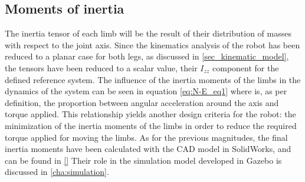 

\subsection{Moments of inertia} %
\label{sub:moments_of_inertia}
The inertia tensor of each limb will be the result of their distribution of masses with respect to the joint axis.
Since the kinematics analysis of the robot has been reduced to a planar case for both legs, as discussed in \ref{sec_kinematic_model}, the tensors have been reduced to a scalar value, their $I_{zz}$ component for the defined reference system.
The influence of the inertia moments of the limbs in the dynamics of the system can be seen in equation \ref{eq:N-E_eq1} where is, as per definition, the proportion between angular acceleration around the axis and torque applied.
This relationship yields another design criteria for the robot: the minimization of the inertia moments of the limbs in order to reduce the required torque applied for moving the limbs.
As for the previous magnitudes, the final inertia moments have been calculated with the CAD model in SolidWorks, and can be found in \ref{}
Their role in the simulation model developed in Gazebo is discussed in \ref{cha:simulation}. 


